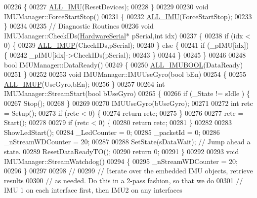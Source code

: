\begin{DoxyCode}
{00226 \{
00227     \hyperlink{_i_m_u_manager_8cpp_a1ad801a60513fb69f99c2732ca068726}{ALL_IMU}(ResetDevices);
00228 \}
00229 
00230 \textcolor{keywordtype}{void} IMUManager::ForceStartStop()
00231 \{
00232     \hyperlink{_i_m_u_manager_8cpp_a1ad801a60513fb69f99c2732ca068726}{ALL_IMU}(ForceStartStop);
00233 \}
00234 
00235 \textcolor{comment}{// Diagnostic Routines}
00236 \textcolor{keywordtype}{void} IMUManager::CheckIDs(\hyperlink{class_hardware_serial}{HardwareSerial}* pSerial,\textcolor{keywordtype}{int} idx)
00237 \{
00238     \textcolor{keywordflow}{if} (idx < 0) \{
00239         \hyperlink{_i_m_u_manager_8cpp_a3264743b07dd4d954bcd87d271d09fd6}{ALL_IMUP}(CheckIDs,pSerial);
00240     \} \textcolor{keywordflow}{else} \{
00241         \textcolor{keywordflow}{if} (\_pIMU[idx]) \{
00242             \_pIMU[idx]->CheckIDs(pSerial);
00243         \}
00244     \}
00245 \}
00246 
00248 \textcolor{keywordtype}{bool} IMUManager::DataReady()
00249 \{
00250     \hyperlink{_i_m_u_manager_8cpp_a1aa43791b69a2c420aed0eae2d0f45dc}{ALL_IMUBOOL}(DataReady)
00251 \}
00252 
00253 \textcolor{keywordtype}{void} IMUManager::IMUUseGyro(\textcolor{keywordtype}{bool} bEn)
00254 \{
00255     \hyperlink{_i_m_u_manager_8cpp_a3264743b07dd4d954bcd87d271d09fd6}{ALL_IMUP}(UseGyro,bEn);
00256 \}
00257 
00264 \textcolor{keywordtype}{int} IMUManager::StreamStart(\textcolor{keywordtype}{bool} bUseGyro)
00265 \{
00266     \textcolor{keywordflow}{if} (\_State != sIdle ) \{
00267         Stop();
00268     \}
00269     
00270     IMUUseGyro(bUseGyro);
00271     
00272     \textcolor{keywordtype}{int} retc = Setup();
00273     \textcolor{keywordflow}{if} (retc < 0) \{
00274         \textcolor{keywordflow}{return} retc;
00275     \}
00276     
00277     retc = Start();
00278     
00279     \textcolor{keywordflow}{if} (retc < 0) \{
00280         \textcolor{keywordflow}{return} retc;
00281     \}
00282     
00283     ShowLedStart();
00284     \_LedCounter = 0;
00285     \_packetId       = 0;
00286     \_nStreamWDCounter = 20;
00287     
00288     SetState(sDataWait); \textcolor{comment}{// Jump ahead a state.}
00289     ResetDataReadyTO();
00290     \textcolor{keywordflow}{return} 0;
00291 \}
00292 
00293 \textcolor{keywordtype}{void} IMUManager::StreamWatchdog()
00294 \{
00295     \_nStreamWDCounter = 20;
00296 \}
00297 
00298 \textcolor{comment}{//}
00299 \textcolor{comment}{//  Iterate over the embedded IMU objects, retrieve results}
00300 \textcolor{comment}{//  as needed. Do this in a 2-pass fashion, so that we do}
00301 \textcolor{comment}{//  IMU 1 on each interface first, then IMU2 on any interfaces}
}
\end{DoxyCode}
